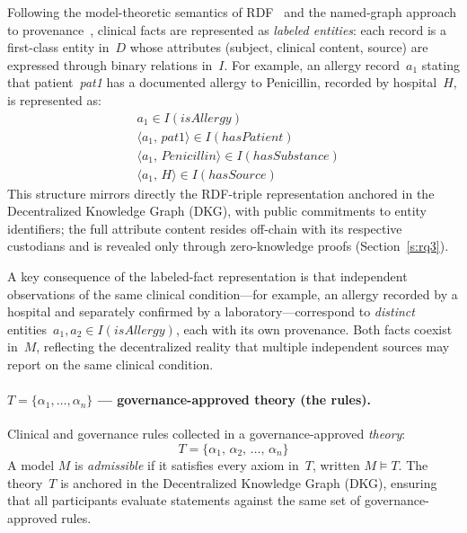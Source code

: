 \documentclass[journal]{IEEEtran}
\begin{document}
Following the model-theoretic semantics of RDF~\cite{rdf12semantics2026}
and the named-graph approach to provenance~\cite{massari2023representing},
clinical facts are represented as \emph{labeled entities}: each
record is a first-class entity in~$D$ whose attributes (subject,
clinical content, source) are expressed through
binary relations in~$I$.  For example, an allergy record~$a_1$
stating that patient~\textit{pat1} has a documented allergy to
Penicillin, recorded by hospital~$H$, is represented
as:
\begin{align*}
  & a_1 \in I(\mathit{isAllergy}) \\
  & \langle a_1,\, \mathit{pat1} \rangle \in I(\mathit{hasPatient}) \\
  & \langle a_1,\, \mathit{Penicillin} \rangle \in I(\mathit{hasSubstance}) \\
  & \langle a_1,\, H \rangle \in I(\mathit{hasSource})
\end{align*}
This structure mirrors directly the RDF-triple representation
anchored in the Decentralized Knowledge Graph (DKG), with
public commitments to entity identifiers; the full attribute
content resides off-chain with its respective custodians and is
revealed only through zero-knowledge proofs
(Section~\ref{s:rq3}).

A key consequence of the labeled-fact representation is that
independent observations of the same clinical condition---for
example, an allergy recorded by a hospital and separately
confirmed by a laboratory---correspond to \emph{distinct}
entities~$a_1, a_2 \in I(\mathit{isAllergy})$, each with its own
provenance.  Both facts coexist in~$M$, reflecting the
decentralized reality that multiple independent sources may
report on the same clinical condition.

\paragraph{$T = \{\alpha_1, \ldots, \alpha_n\}$ — governance-approved
           theory (the rules).}

Clinical and governance rules collected in a governance-approved
\emph{theory}:
\begin{equation}\label{eq:theory}
  T = \{\alpha_1,\, \alpha_2,\, \ldots,\, \alpha_n\}
\end{equation}
A model $M$ is \emph{admissible} if it satisfies every axiom
in~$T$, written $M \models T$. The theory~$T$ is anchored in
the Decentralized Knowledge Graph (DKG), ensuring that all
participants evaluate statements against the same set of
governance-approved rules.
\end{document}
